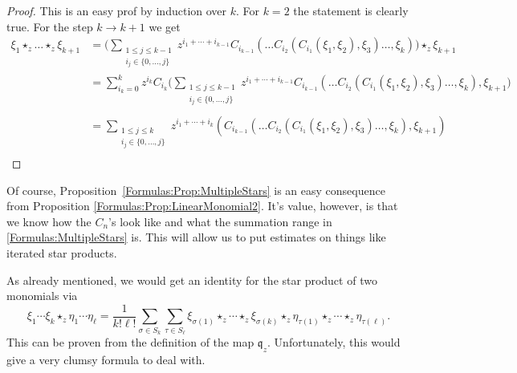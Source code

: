 \begin{proof}
	This is an easy prof by induction over $k$. For $k = 2$ the statement is 
	clearly true. For the step $k \rightarrow k + 1$ we get
	\begin{align*}
		\xi_1 \star_z \ldots \star_z \xi_{k+1}
		& =
		\Bigg(
			\sum\limits_{\substack{
				1 \leq j \leq k-1 \\
				i_j \in \{0, \ldots, j\}
			}}
			z^{i_1 + \cdots + i_{k-1}}
			C_{i_{k-1}}
			\left(
				\ldots C_{i_2}
				\left(
					C_{i_1} 
					\left( \xi_1, \xi_2 \right)
					, \xi_3	
				\right) 
				\ldots, \xi_{k}
			\right)
		\Bigg)
		\star_z \xi_{k+1}
		\\
		& = 
		\sum\limits_{i_k = 0}^k
		z^{i_k}
		C_{i_k}
		\Bigg(
			\sum\limits_{\substack{
				1 \leq j \leq k-1 \\
				i_j \in \{0, \ldots, j\} \\
			}}
			z^{i_1 + \cdots + i_{k-1}}
			C_{i_{k-1}}
			\left(
				\ldots C_{i_2}
				\left(
					C_{i_1} 
					\left( \xi_1, \xi_2 \right)
					, \xi_3	
				\right) 
				\ldots, \xi_{k}
			\right)
			, \xi_{k+1}
		\Bigg)
		\\
		& = 
		\sum\limits_{\substack{
			1 \leq j \leq k \\
			i_j \in \{0, \ldots, j\} \\
		}}
		z^{i_1 + \cdots + i_k}
		\left(
			C_{i_{k-1}}
			\left(
				\ldots C_{i_2}
				\left(
					C_{i_1} 
					\left( \xi_1, \xi_2 \right)
					, \xi_3	
				\right) 
				\ldots, \xi_{k}
			\right)
			, \xi_{k+1}
		\right)
	\end{align*}
\end{proof}
\begin{remark}
	\mbox{}
	\begin{remarklist}
		\item
		Of course, Proposition~\ref{Formulas:Prop:MultipleStars}  is an easy 
		consequence from Proposition \ref{Formulas:Prop:LinearMonomial2}.
		It's value, however, is that we know how the $C_n$'s look like and 
		what the summation range in \eqref{Formulas:MultipleStars} is. This 
		will allow us to put estimates on things like iterated star products.
		
		\item
		As already mentioned, we would get an identity for the star product of 
		two monomials via
		\begin{equation}
			\label{Formulas:2MonomialsWeird}
			\xi_1 \cdots \xi_k \star_z \eta_1 \cdots \eta_{\ell}
			=
			\frac{1}{k! \ell!}
			\sum\limits_{\sigma \in S_k}
			\sum\limits_{\tau \in S_{\ell}}
			\xi_{\sigma(1)} \star_z \cdots \star_z \xi_{\sigma(k)}
			\star_z
			\eta_{\tau(1)} \star_z \cdots \star_z \eta_{\tau(\ell)}.
		\end{equation}
		This can be proven from the definition of the map $\mathfrak{q}_z$.
		Unfortunately, this would give a very clumsy formula to deal with.
	\end{remarklist}
\end{remark}



